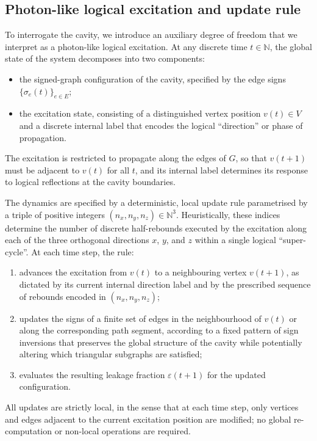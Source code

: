 \documentclass{article}
\theoremstyle{definition}
\begin{document}
\subsection{Photon-like logical excitation and update rule}

To interrogate the cavity, we introduce an auxiliary degree of freedom that we interpret as a photon-like logical excitation. At any discrete time $t \in \mathbb{N}$, the global state of the system decomposes into two components:
\begin{itemize}
  \item the signed-graph configuration of the cavity, specified by the edge signs $\{\sigma_e(t)\}_{e \in E}$;
  \item the excitation state, consisting of a distinguished vertex position $v(t) \in V$ and a discrete internal label that encodes the logical ``direction'' or phase of propagation.
\end{itemize}
The excitation is restricted to propagate along the edges of $G$, so that $v(t+1)$ must be adjacent to $v(t)$ for all $t$, and its internal label determines its response to logical reflections at the cavity boundaries.\cite{Effective_Fields_PDL_2026}

The dynamics are specified by a deterministic, local update rule parametrised by a triple of positive integers $(n_x,n_y,n_z) \in \mathbb{N}^3$. Heuristically, these indices determine the number of discrete half-rebounds executed by the excitation along each of the three orthogonal directions $x$, $y$, and $z$ within a single logical ``super-cycle''.\cite{Effective_Fields_PDL_2026} At each time step, the rule:
\begin{enumerate}
  \item advances the excitation from $v(t)$ to a neighbouring vertex $v(t+1)$, as dictated by its current internal direction label and by the prescribed sequence of rebounds encoded in $(n_x,n_y,n_z)$;
  \item updates the signs of a finite set of edges in the neighbourhood of $v(t)$ or along the corresponding path segment, according to a fixed pattern of sign inversions that preserves the global structure of the cavity while potentially altering which triangular subgraphs are satisfied;
  \item evaluates the resulting leakage fraction $\varepsilon(t+1)$ for the updated configuration.
\end{enumerate}
All updates are strictly local, in the sense that at each time step, only vertices and edges adjacent to the current excitation position are modified; no global re-computation or non-local operations are required.\cite{PDL_Main_2026,Effective_Fields_PDL_2026}
\end{document}

